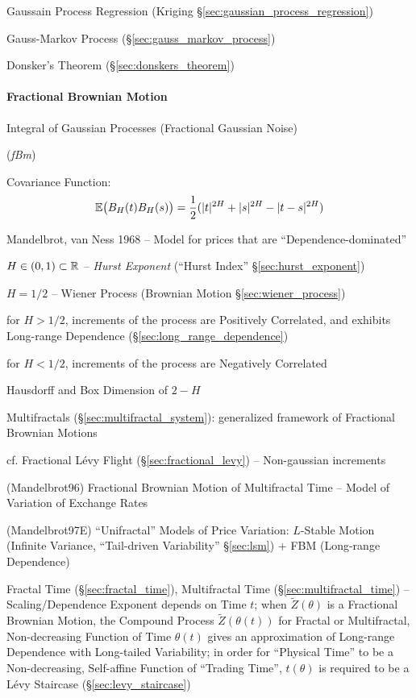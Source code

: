 Gaussain Process Regression (Kriging \S\ref{sec:gaussian_process_regression})

\fist Gauss-Markov Process (\S\ref{sec:gauss_markov_process})

\fist Donsker's Theorem (\S\ref{sec:donskers_theorem})



\paragraph{Fractional Brownian Motion}\label{sec:fractional_brownian}\hfill

Integral of Gaussian Processes (Fractional Gaussian Noise)

(\emph{fBm})

Covariance Function:
\[
  \mathbb{E}\big(B_H(t) B_H(s)\big) =
    \frac{1}{2} (|t|^{2H} + |s|^{2H} - |t - s|^{2H})
\]

Mandelbrot, van Ness 1968 -- Model for prices that are ``Dependence-dominated''

$H \in (0,1) \subset \mathbb{R}$ -- \emph{Hurst Exponent} (``Hurst Index''
\S\ref{sec:hurst_exponent})

$H = 1/2$ -- Wiener Process (Brownian Motion \S\ref{sec:wiener_process})

for $H > 1/2$, increments of the process are Positively Correlated, and exhibits
Long-range Dependence (\S\ref{sec:long_range_dependence})

for $H < 1/2$, increments of the process are Negatively Correlated

Hausdorff and Box Dimension of $2 - H$

\fist Multifractals (\S\ref{sec:multifractal_system}): generalized framework of
Fractional Brownian Motions

cf. Fractional L\'evy Flight (\S\ref{sec:fractional_levy}) -- Non-gaussian
increments

(Mandelbrot96) Fractional Brownian Motion of Multifractal Time -- Model of
Variation of Exchange Rates

(Mandelbrot97E) ``Unifractal'' Models of Price Variation: $L$-Stable Motion
(Infinite Variance, ``Tail-driven Variability'' \S\ref{sec:lsm}) + FBM
(Long-range Dependence)

\fist Fractal Time (\S\ref{sec:fractal_time}), Multifractal Time
(\S\ref{sec:multifractal_time}) -- Scaling/Dependence Exponent depends on Time
$t$; when $\tilde{Z}(\theta)$ is a Fractional Brownian Motion, the Compound
Process $\tilde{Z}(\theta(t))$ for Fractal or Multifractal, Non-decreasing
Function of Time $\theta(t)$ gives an approximation of Long-range Dependence
with Long-tailed Variability; in order for ``Physical Time'' to be a
Non-decreasing, Self-affine Function of ``Trading Time'', $t(\theta)$ is
required to be a L\'evy Staircase (\S\ref{sec:levy_staircase})

